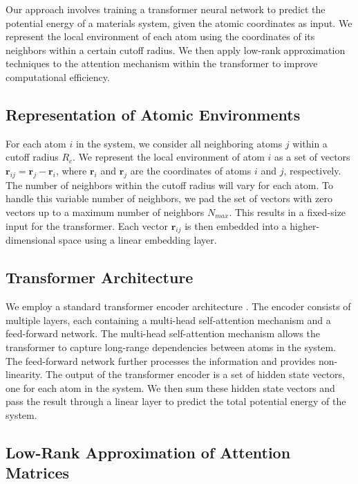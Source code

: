 \documentclass{article}
\begin{document}
Our approach involves training a transformer neural network to predict the potential energy of a materials system, given the atomic coordinates as input. We represent the local environment of each atom using the coordinates of its neighbors within a certain cutoff radius. We then apply low-rank approximation techniques to the attention mechanism within the transformer to improve computational efficiency.

\subsection{Representation of Atomic Environments}

For each atom $i$ in the system, we consider all neighboring atoms $j$ within a cutoff radius $R_c$. We represent the local environment of atom $i$ as a set of vectors $\mathbf{r}_{ij} = \mathbf{r}_j - \mathbf{r}_i$, where $\mathbf{r}_i$ and $\mathbf{r}_j$ are the coordinates of atoms $i$ and $j$, respectively. The number of neighbors within the cutoff radius will vary for each atom. To handle this variable number of neighbors, we pad the set of vectors with zero vectors up to a maximum number of neighbors $N_{max}$. This results in a fixed-size input for the transformer. Each vector $\mathbf{r}_{ij}$ is then embedded into a higher-dimensional space using a linear embedding layer.

\subsection{Transformer Architecture}

We employ a standard transformer encoder architecture \cite{vaswani2017attention}. The encoder consists of multiple layers, each containing a multi-head self-attention mechanism and a feed-forward network. The multi-head self-attention mechanism allows the transformer to capture long-range dependencies between atoms in the system. The feed-forward network further processes the information and provides non-linearity. The output of the transformer encoder is a set of hidden state vectors, one for each atom in the system. We then sum these hidden state vectors and pass the result through a linear layer to predict the total potential energy of the system.

\subsection{Low-Rank Approximation of Attention Matrices}
\end{document}
